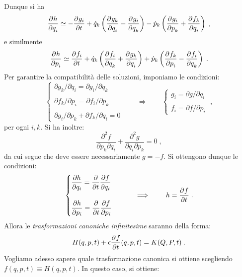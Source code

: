 Dunque si ha 
\begin{equation}
\frac{\partial^{}h}{\partial q_i^{}}\simeq -\frac{\partial^{}g_i}{\partial t^{}}+\dot{q}_k\left(\frac{\partial^{}g_k}{\partial q_i^{}}-\frac{\partial^{}g_i}{\partial q_k^{}}\right)-\dot{p}_k\left(\frac{\partial^{}g_i}{\partial p_k^{}}+\frac{\partial^{}f_k}{\partial q_i^{}}\right)\;,
\end{equation}
e similmente
\begin{equation}
\frac{\partial^{}h}{\partial p_i^{}}\simeq \frac{\partial^{}f_i}{\partial t^{}}+\dot{q}_k\left(\frac{\partial^{}f_i}{\partial q_k^{}}+\frac{\partial^{}g_k}{\partial q_i^{}}\right)+\dot{p}_k\left(\frac{\partial^{}f_k}{\partial p_i^{}}-\frac{\partial^{}f_i}{\partial q_k^{}}\right)\;.
\end{equation}
Per garantire la compatibilità delle soluzioni, imponiamo le condizioni:
\begin{equation}
\begin{cases}
\partial g_k/\partial q_i=\partial g_i/\partial q_k \\
\\
\partial f_k/\partial p_i=\partial f_i/\partial p_k \\
\\
\partial g_i/\partial p_k+\partial f_k/\partial q_i=0
\end{cases}\qquad \Longrightarrow \qquad
\begin{cases}
g_i=\partial g/\partial q_i \\
\\
f_i=\partial f/\partial p_i
\end{cases}\;,
\end{equation}
per ogni $i,k$. Si ha inoltre:
\begin{equation}
\frac{\partial^2 f}{\partial p_k\partial q_i}+\frac{\partial^2 g}{\partial q_i\partial p_k}=0\;,
\end{equation}
da cui segue che deve essere necessariamente $g=-f$. Si ottengono dunque le condizioni:
\begin{equation}
\begin{cases}
\dfrac{\partial h}{\partial q_i}=\dfrac{\partial}{\partial t}\dfrac{\partial f}{\partial q_i} \\
\\
\dfrac{\partial h}{\partial p_i}=\dfrac{\partial}{\partial t}\dfrac{\partial f}{\partial p_i}
\end{cases}\qquad \implies \qquad h=\frac{\partial^{}f}{\partial t^{}}\;.
\end{equation}
Allora le \textit{trasformazioni canoniche infinitesime} saranno della forma:
\begin{equation}
H(q,p,t)+\epsilon\frac{\partial^{}f}{\partial t^{}}(q,p,t)=K(Q,P,t)\;.
\end{equation}
Vogliamo adesso sapere quale trasformazione canonica si ottiene scegliendo $f(q,p,t)\equiv H(q,p,t)$. In questo caso, si ottiene:
